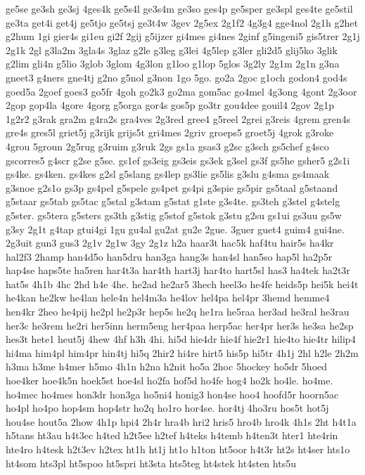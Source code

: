 {ge5se
ge3sh
ge3sj
4ges4k
ge5s4l
ge3s4m
ge3so
ges4p
ge5sper
ge3spl
ges4te
ge5stil
ge3ta
get4i
get4j
ge5tjo
ge5tsj
ge3t4w
3gev
2g5ex
2g1f2
4g3g4
gge4nol
2g1h
g2het
g2hum
1gi
gier4s
gi1eu
gi2f
2gij
g5ijzer
gi4mes
gi4nes
2ginf
g5ingeni5
gis5trer
2g1j
2g1k
2gl
g3la2m
3gla4s
3glaz
g2le
g3leg
g3lei
4g5lep
g3ler
gli2d5
glij5ko
3glik
g2lim
gli4n
g5lio
3glob
3glom
4g3lon
g1loo
g1lop
5glos
3g2ly
2g1m
2g1n
g3na
gneet3
g4ners
gne4tj
g2no
g5nol
g3non
1go
5go.
go2a
2goc
g1och
godon4
god4s
goed5a
2goef
goes3
go5fr
4goh
go2k3
go2ma
gom5ac
go4mel
4g3ong
4gont
2g3oor
2gop
gop4la
4gore
4gorg
g5orga
gor4s
gos5p
go3tr
gou4dee
gouil4
2gov
2g1p
1g2r2
g3rak
gra2m
g4ra2s
gra4ves
2g3red
gree4
g5reel
2grei
g3reis
4grem
gren4s
gre4s
gres5l
griet5j
g3rijk
grijs5t
gri4mes
2griv
groeps5
groet5j
4grok
g3roke
4grou
5groun
2g5rug
g3ruim
g3ruk
2gs
gs1a
gsas3
g2sc
g3sch
gs5chef
g4sco
gscorres5
g4scr
g2se
g5se.
gs1ef
gs3eig
gs3eis
gs3ek
g3sel
gs3f
gs5he
gsher5
g2s1i
gs4ke.
gs4ken.
gs4kes
g2sl
g5slang
gs4lep
gs3lie
gs5lis
g3slu
g4sma
gs4maak
g3snoe
g2s1o
gs3p
gs4pel
g5spele
gs4pet
gs4pi
g3spie
gs5pir
gs5taal
g5staand
g5staar
gs5tab
gs5tac
g5stal
g3stam
g5stat
g1ste
g3s4te.
gs3teh
g3stel
g4stelg
g5ster.
gs5tera
g5sters
gs3th
g3stig
g5stof
g5stok
g3stu
g2su
gs1ui
gs3uu
gs5w
g3sy
2g1t
g4tap
gtui4gi
1gu
gu4al
gu2at
gu2e
2gue.
3guer
guet4
guim4
gui4ne.
2g3uit
gun3
gus3
2g1v
2g1w
3gy
2g1z
h2a
haar3t
hac5k
haf4tu
hair5s
ha4kr
hal2f3
2hamp
han4d5o
han5dru
han3ga
hang3s
han4sl
han5so
hap5l
ha2p5r
hap4se
haps5te
ha5ren
har4t3a
har4th
hart3j
har4to
hart5sl
has3
ha4tek
ha2t3r
hat5s
4h1b
4hc
2hd
h4e
4he.
he2ad
he2ar5
3hech
heel3o
he4fe
heids5p
hei5k
hei4t
he4kan
he2kw
he4lan
hele4n
hel4m3a
he4lov
hel4pa
hel4pr
3hemd
hemme4
hen4kr
2heo
he4pij
he2pl
he2p3r
hep5s
he2q
he1ra
he5raa
her3ad
he3ral
he3rau
her3c
he3rem
he2ri
her5inn
herm5eng
her4paa
herp5ac
her4pr
her3s
he3sa
he2sp
hes3t
hete1
heut5j
4hew
4hf
h3h
4hi.
hi5d
hie4dr
hie4f
hie2r1
hie4to
hie4tr
hilip4
hi4ma
him4pl
him4pr
hin4tj
hi5q
2hir2
hi4re
hirt5
his5p
hi5tr
4h1j
2hl
h2le
2h2m
h3ma
h3me
h4mer
h5mo
4h1n
h2na
h2nit
ho5a
2hoc
5hockey
ho5dr
5hoed
hoe4ker
hoe4k5n
hoek5st
hoe4sl
ho2fa
hof5d
ho4fe
hog4
ho2k
ho4le.
ho4me.
ho4mec
ho4mes
hon3dr
hon3ga
ho5ni4
honig3
hon4se
hoo4
hoofd5r
hoorn5ac
ho4pl
ho4po
hop4sm
hop4str
ho2q
ho1ro
hor4se.
hor4tj
4ho3ru
hos5t
hot5j
hou4se
hout5a
2how
4h1p
hpi4
2h4r
hra4b
hri2
hris5
hro4b
hro4k
4h1s
2ht
h4t1a
h5tans
ht3au
h4t3ec
h4ted
h2t5ee
h2tef
h4teks
h4temb
h4ten3t
hter1
hte4rin
hte4ro
h4tesk
h2t3ev
h2tex
ht1h
ht1j
ht1o
h1ton
ht5oor
h4t3r
ht2s
ht4ser
hts1o
ht4som
hts3pl
ht5spoo
ht5spri
ht3sta
hts5teg
ht4stek
ht4sten
hts5u
}
